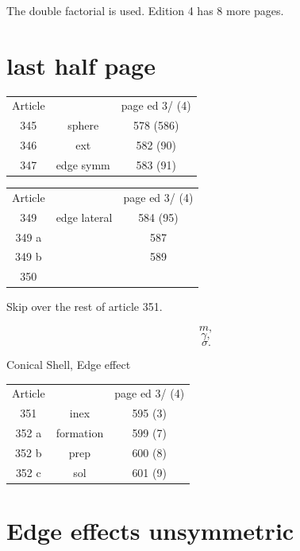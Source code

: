 \documentclass[a4paper,draft]{book}
\begin{document}
The double factorial is used.  Edition 4 has 8 more pages.

\setcounter{section}{344}
\section{last half page}
\begin{tabular}{ccc}
Article&   & page ed 3/ (4) \\
345    & sphere  & 578 (586) \\
346    & ext  & 582 (90) \\
347    & edge symm  & 583 (91) \\
\end{tabular}



\setcounter{equation}{75}






\begin{tabular}{ccc}
Article&   & page ed 3/ (4) \\
349    & edge lateral & 584 (95) \\
349 a  &  & 587 \\
349 b &   & 589  \\
350   &   &   \\
\end{tabular}

\setcounter{section}{350}


Skip over the rest of article 351.

\setcounter{equation}{161}
\begin{equation}\label{eq161} m, \end{equation}
\begin{equation}\label{eq162} \gamma, \end{equation}
\begin{equation}\label{eq163} \sigma. \end{equation}

Conical Shell, Edge effect
\begin{tabular}{ccc}
Article&   & page ed 3/ (4) \\
351    & inex & 595 (3) \\
352 a   & formation & 599  (7) \\
352 b   & prep &   600 (8) \\
352 c   & sol &   601 (9) \\
\end{tabular}
\section{Edge effects unsymmetric}



\end{document}
